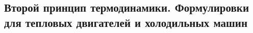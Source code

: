 \subsection{\textbf{Второй принцип термодинамики. Формулировки для тепловых двигателей и холодильных машин}}